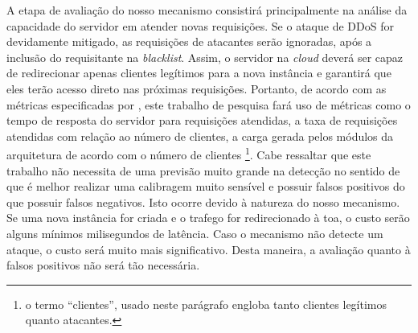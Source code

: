 A etapa de avaliação do nosso mecanismo consistirá principalmente na análise
da capacidade do servidor em atender novas requisições. Se o ataque de DDoS for devidamente
mitigado, as requisições de atacantes serão ignoradas, após a inclusão do requisitante na \emph{blacklist}. Assim, o servidor na \emph{cloud} deverá ser capaz de redirecionar apenas clientes legítimos 
para a nova instância e garantirá que eles terão acesso direto nas próximas requisições. %
Portanto, de acordo com as métricas especificadas por \cite{4600003}, este trabalho de pesquisa fará uso de métricas como o tempo de resposta do servidor para requisições atendidas, a taxa de requisições atendidas com relação ao número de clientes, a carga gerada pelos módulos da arquitetura de acordo com o número de clientes \footnote{o termo ``clientes'', usado neste parágrafo engloba tanto clientes legítimos quanto atacantes.}. 
Cabe ressaltar que este trabalho não necessita de uma previsão muito grande na detecção no sentido de que é melhor realizar uma calibragem muito sensível e possuir falsos positivos do que possuir falsos negativos. Isto ocorre devido à natureza do nosso mecanismo. Se uma nova instância for criada e o trafego for redirecionado à toa, o custo serão alguns mínimos milisegundos de latência. Caso o mecanismo não detecte um ataque, o custo será muito mais significativo. Desta maneira, a avaliação quanto à falsos positivos não será tão necessária. %
